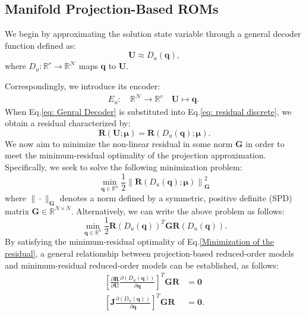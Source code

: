 \subsection{Manifold Projection-Based ROMs}
\label{subsec: manifold-projection-based-rom}

We begin by approximating the solution state variable through a general decoder function defined as:
\begin{equation}
\mathbf{U} \approx D_u(\mathbf{q}),
\label{eq: Genral Decoder}
\end{equation}
where $D_u: \mathbb{R}^r \rightarrow \mathbb{R}^{\mathcal{N}}$ maps $\mathbf{q}$ to $\mathbf{U}$.

Correspondingly, we introduce its encoder:
\begin{equation}
\begin{aligned}
E_u: \ & \mathbb{R}^{\mathcal{N}} \rightarrow \mathbb{R}^r \
& \mathbf{U} \mapsto \mathbf{q}.\
\end{aligned}
\end{equation}
When Eq.\ref{eq: Genral Decoder} is substituted into Eq.\ref{eq: residual discrete}, we obtain a residual characterized by:
\begin{equation}
\mathbf{R}(\mathbf{U};\boldsymbol{\mu})=\mathbf{R}(D_u(\mathbf{q});\boldsymbol{\mu}).
    \label{eq: Discrete residual (decoder)}
\end{equation}
We now aim to minimize the non-linear residual in some norm $\mathbf{G}$ in order to meet the minimum-residual optimality of the projection approximation. Specifically, we seek to solve the following minimization problem:
\begin{equation}
    \min_{\mathbf{q} \in \mathbb{R}^n} \frac{1}{2}\left\lVert \mathbf{R}(D_u(\mathbf{q});\boldsymbol{\mu}) \right\rVert_{\mathbf{G}}^2 
    \label{Minimization of the residual}
\end{equation}
where $\|\cdot\|_{\mathbf{G}}$ denotes a norm defined by a symmetric, positive definite (SPD) matrix $\mathbf{G} \in \mathbb{R}^{N\times N}$. Alternatively, we can write the above problem as follows:
\begin{equation}
    \min_{\mathbf{q} \in \mathbb{R}^n} \frac{1}{2}\mathbf{R}(D_u(\mathbf{q}))^T\mathbf{G}\mathbf{R}(D_u(\mathbf{q})).
\end{equation}
By satisfying the minimum-residual optimality of Eq.\ref{Minimization of the residual}, a general relationship between projection-based reduced-order models and minimum-residual reduced-order models can be established, as follows: 
\begin{equation}
\begin{aligned}
    \left[\frac{\partial \mathbf{R}}{\partial \mathbf{U}} \frac{\partial (D_u(\mathbf{q}))}{\partial \mathbf{q}}\right]^T\mathbf{G}\mathbf{R}&=\mathbf{0}\\
    \left[\mathbf{J}\frac{\partial (D_u(\mathbf{q}))}{\partial \mathbf{q}}\right]^T\mathbf{G}\mathbf{R}&=\mathbf{0}.
\end{aligned}
\end{equation}

